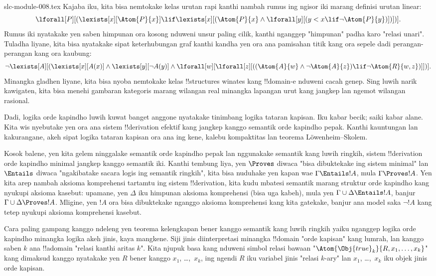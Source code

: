 \begin{filecontents*}[overwrite]{slc-module-008.tex}
Kajaba iku, kita bisa
nemtokake kelas urutan rapi
kanthi nambah rumus ing
ngisor iki marang definisi
urutan linear:
\[
\lforall[P][(\lexists[x][\Atom{P}{x}] \lif \lexists[x][(\Atom{P}{x}
    \land \lforall[y][(y < x \lif \lnot \Atom{P}{y})])])].
\]
Rumus iki nyatakake yen
saben himpunan ora kosong
nduweni unsur paling cilik,
kanthi nganggep "himpunan"
padha karo "relasi unari".
Tuladha liyane, kita bisa
nyatakake sipat keterhubungan
graf kanthi kandha yen ora
ana pamisahan titik kang
ora sepele dadi perangan-
perangan kang ora kaubung:
\[
\lnot \lexists[A][(\lexists[x][A(x)] \land \lexists[y][\lnot A(y)]
  \land \lforall[w][\lforall[z][((\Atom{A}{w} \land \lnot \Atom{A}{z})
      \lif \lnot \Atom{R}{w,z})]])].
\]
Minangka gladhen liyane,
kita bisa nyoba nemtokake
kelas !!{structure}s winates
kang !!{domain}-e nduweni
cacah genep. Sing luwih
narik kawigaten, kita bisa
menehi gambaran kategoris
marang wilangan real minangka
lapangan urut kang jangkep
lan ngemot wilangan rasional.

Dadi, logika orde kapindho
luwih kuwat banget anggone
nyatakake tinimbang logika tataran
kapisan. Iku kabar becik;
saiki kabar alane. Kita wis
nyebutake yen ora ana sistem
!!{derivation} efektif
kang jangkep kanggo semantik
orde kapindho pepak. Kanthi
kauntungan lan kakurangane,
akeh sipat logika tataran kapisan
ora ana ing kene, kalebu
kompaktitas lan teorema
L\"owenheim--Skolem.

Kosok balene, yen kita gelem
ninggalake semantik orde
kapindho pepak lan nggunakake
semantik kang luwih ringkih,
sistem !!{derivation}
orde kapindho minimal jangkep
kanggo semantik iki. Kanthi
tembung liya, yen $\Proves$
diwaca "bisa dibuktekake
ing sistem minimal" lan
$\Entails$ diwaca
"ngakibatake sacara logis
ing semantik ringkih",
kita bisa nuduhake yen
kapan wae $\Gamma \Entails !A$,
mula $\Gamma \Proves !A$.
Yen kita arep nambah aksioma
komprehensi tartamtu ing
sistem !!{derivation},
kita kudu mbatesi semantik
marang struktur orde
kapindho kang nyukupi
aksioma kasebut: upamane,
yen $\Delta$ iku himpunan
aksioma komprehensi
(bisa uga kabeh), mula yen
$\Gamma
\cup \Delta \Entails !A$,
banjur $\Gamma \cup \Delta \Proves !A$.
Mligine, yen $!A$ ora
bisa dibuktekake nganggo
aksioma komprehensi kang
kita gatekake, banjur
ana model saka $\lnot !A$
kang tetep nyukupi
aksioma komprehensi kasebut.

Cara paling gampang kanggo
ndeleng yen teorema
kelengkapan bener kanggo
semantik kang luwih ringkih
yaiku nganggep logika orde
kapindho minangka logika
akeh jinis, kaya mangkene.
Siji jinis diinterpretasi
minangka !!{domain}
"orde kapisan" kang lumrah,
lan kanggo saben $k$
ana !!a{domain} "relasi
kanthi aritas $k$".
Kita njupuk basa kang
nduweni simbol relasi
bawaan "$\Atom{\Obj{true}_k}{R,x_1,\dots,x_k}$"
kang dimaksud kanggo
nyatakake yen $R$ bener
kanggo $x_1$, \dots,~$x_k$,
ing ngendi $R$ iku
variabel jinis "relasi
$k$-ary" lan $x_1$,
\dots,~$x_k$ iku objek
jinis orde kapisan.


\end{filecontents*}
